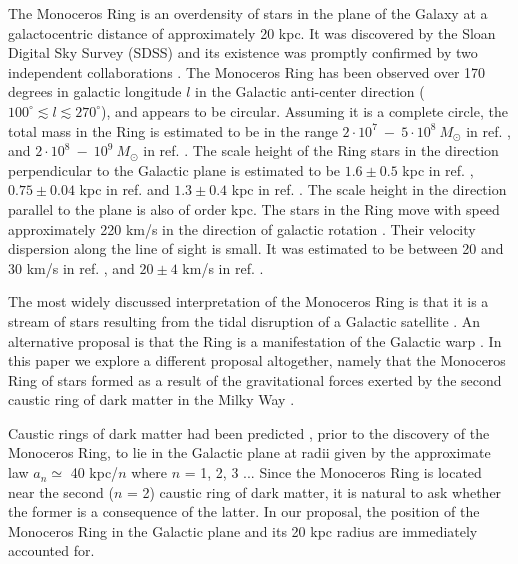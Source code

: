 \documentclass[aps,prd,preprint,tightenlines,floatfix,showpacs,groupedaddress]{revtex4}
\begin{document}
The Monoceros Ring is an overdensity of stars in the plane of the 
Galaxy at a galactocentric distance of approximately 20 kpc.  It was
discovered by the Sloan Digital Sky Survey (SDSS) \cite{New02,Yan03} 
and its existence was promptly confirmed by two independent 
collaborations \cite{Iba03,Roch03}.  The Monoceros Ring has been 
observed over 170 degrees in galactic longitude $l$ in the Galactic 
anti-center direction ($100^\circ \lesssim l \lesssim 270^\circ$), 
and appears to be circular.  Assuming it is a complete circle, 
the total mass in the Ring is estimated to be in the range 
$2 \cdot 10^7~-~5 \cdot 10^8~M_\odot$ in ref. \cite{Yan03}, 
and $2 \cdot 10^8~-~10^9~M_\odot$ in ref. \cite{Iba03}. The 
scale height of the Ring stars in the direction perpendicular 
to the Galactic plane is estimated to be $1.6 \pm 0.5$ kpc in 
ref. \cite{Yan03}, $0.75 \pm 0.04$ kpc in ref. \cite{Iba03} and 
$1.3 \pm 0.4$ kpc in ref. \cite{Roch03}.  The scale height in the 
direction parallel to the plane is also of order kpc.  The stars 
in the Ring move with speed approximately 220 km/s in the direction 
of galactic rotation \cite{Cran03,Yan04}.  Their velocity dispersion 
along the line of sight is small.  It was estimated to be between 
20 and 30 km/s in ref. \cite{Yan03}, and $20 \pm 4$ km/s in 
ref. \cite{Cran03}.

The most widely discussed interpretation of the Monoceros Ring 
is that it is a stream of stars resulting from the tidal disruption 
of a Galactic satellite \cite{Helm03,Mart05,Pena05}.  An alternative 
proposal is that the Ring is a manifestation of the Galactic warp 
\cite{Moma04,Moma06}.  In this paper we explore a different proposal
altogether, namely that the Monoceros Ring of stars formed as a result 
of the gravitational forces exerted by the second caustic ring of dark 
matter in the Milky Way \cite{milk}.

Caustic rings of dark matter had been predicted \cite{cr}, prior
to the discovery of the Monoceros Ring, to lie in the Galactic 
plane at radii given by the approximate law $a_n \simeq$ 40 kpc/$n$
where $n$ = 1, 2, 3 ...  Since the Monoceros Ring is located near 
the second ($n$ = 2) caustic ring of dark matter, it is natural to 
ask whether the former is a consequence of the latter.  In our 
proposal, the position of the Monoceros Ring in the Galactic 
plane and its 20 kpc radius are immediately accounted for.
\end{document}
